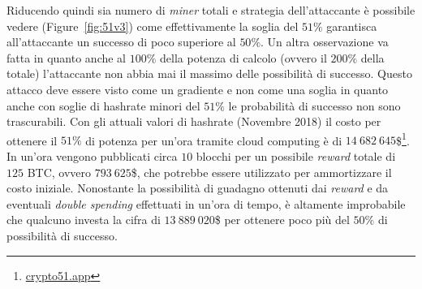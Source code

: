 Riducendo quindi sia numero di \textit{miner} totali e strategia dell'attaccante è possibile vedere (Figure~\ref{fig:51v3}) come effettivamente la soglia del $51\%$ garantisca all'attaccante un successo di poco superiore al $50\%$. Un altra osservazione va fatta in quanto anche al $100\%$ della potenza di calcolo (ovvero il $200\%$ della totale) l'attaccante non abbia mai il massimo delle possibilità di successo.\newline
Questo attacco deve essere visto come un gradiente e non come una soglia in quanto anche con soglie di hashrate minori del $51\%$ le probabilità di successo non sono trascurabili. Con gli attuali valori di hashrate (Novembre 2018) il costo per ottenere il $51\%$ di potenza per un'ora tramite cloud computing è di $14~682~645$\$\footnote{\href{https://www.crypto51.app/}{crypto51.app}}. In un'ora vengono pubblicati circa $10$ blocchi per un possibile \textit{reward} totale di $125$ BTC, ovvero $793~625$\$, che potrebbe essere utilizzato per ammortizzare il costo iniziale. Nonostante la possibilità di guadagno ottenuti dai \textit{reward} e da eventuali \textit{double spending} effettuati in un'ora di tempo, è altamente improbabile che qualcuno investa la cifra di $13~889~020$\$ per ottenere poco più del $50\%$ di possibilità di successo.


